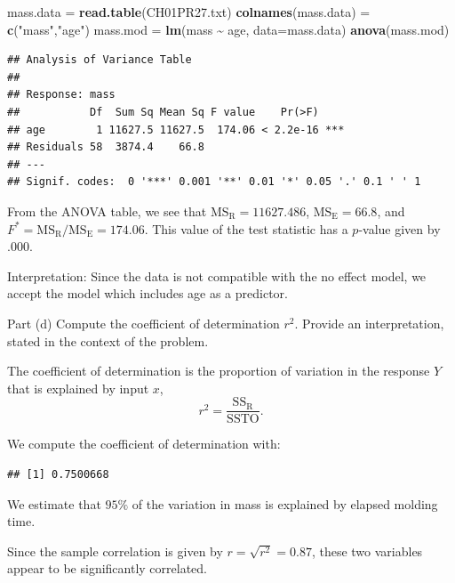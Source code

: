\documentclass[
]{article}
\newenvironment{Shaded}{\begin{snugshade}}{\end{snugshade}}
\newcommand{\AttributeTok}[1]{\textcolor[rgb]{0.13,0.29,0.53}{#1}}
\newcommand{\FunctionTok}[1]{\textcolor[rgb]{0.13,0.29,0.53}{\textbf{#1}}}
\newcommand{\NormalTok}[1]{#1}
\newcommand{\OtherTok}[1]{\textcolor[rgb]{0.56,0.35,0.01}{#1}}
\newcommand{\SpecialCharTok}[1]{\textcolor[rgb]{0.81,0.36,0.00}{\textbf{#1}}}
\newcommand{\StringTok}[1]{\textcolor[rgb]{0.31,0.60,0.02}{#1}}
\begin{document}
\begin{Shaded}
\begin{Highlighting}[]
\NormalTok{mass.data }\OtherTok{=} \FunctionTok{read.table}\NormalTok{(}\StringTok{\textquotesingle{}CH01PR27.txt\textquotesingle{}}\NormalTok{)}
\FunctionTok{colnames}\NormalTok{(mass.data) }\OtherTok{=} \FunctionTok{c}\NormalTok{(}\StringTok{"mass"}\NormalTok{,}\StringTok{"age"}\NormalTok{)}
\NormalTok{mass.mod }\OtherTok{=} \FunctionTok{lm}\NormalTok{(mass }\SpecialCharTok{\textasciitilde{}}\NormalTok{ age, }\AttributeTok{data=}\NormalTok{mass.data)}
\FunctionTok{anova}\NormalTok{(mass.mod)}
\end{Highlighting}
\end{Shaded}

\begin{verbatim}
## Analysis of Variance Table
## 
## Response: mass
##           Df  Sum Sq Mean Sq F value    Pr(>F)    
## age        1 11627.5 11627.5  174.06 < 2.2e-16 ***
## Residuals 58  3874.4    66.8                      
## ---
## Signif. codes:  0 '***' 0.001 '**' 0.01 '*' 0.05 '.' 0.1 ' ' 1
\end{verbatim}

From the ANOVA table, we see that \(\operatorname{MS_R}= 11627.486\),
\(\operatorname{MS_E}= 66.8\), and
\(F^* = \operatorname{MS_R}/ \operatorname{MS_E}= 174.06\). This value
of the test statistic has a \(p\)-value given by \(.000\).

Interpretation: Since the data is not compatible with the no effect
model, we accept the model which includes age as a predictor.

\begin{tcolorbox}[split=\f]
Part (d)
\tcblower
Compute the coefficient of determination $r^2$.
Provide an interpretation, stated in the context of the problem.
\end{tcolorbox}

The coefficient of determination is the proportion of variation in the
response \(Y\) that is explained by input \(x\), \[
  r^2 = \frac{\operatorname{SS_R}}{\operatorname{SSTO}}.
\]

We compute the coefficient of determination with:

\begin{Shaded}
\end{Shaded}

\begin{verbatim}
## [1] 0.7500668
\end{verbatim}

We estimate that \(95\%\) of the variation in mass is explained by
elapsed molding time.

Since the sample correlation is given by \(r = \sqrt{r^2} = 0.87\),
these two variables appear to be significantly correlated.
\end{document}
